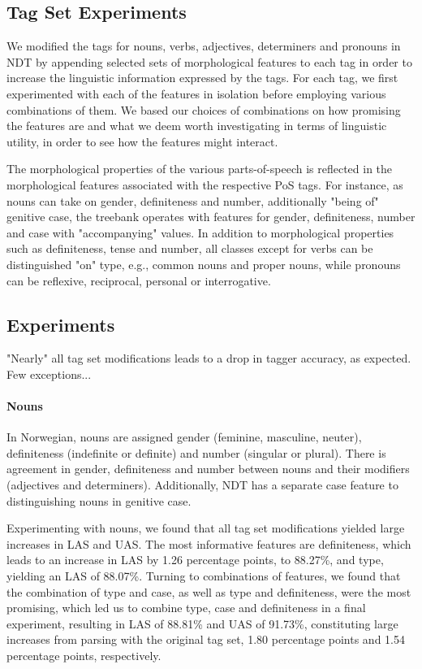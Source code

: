 \documentclass[11pt,a4paper]{article}
\begin{document}
\subsection{Tag Set Experiments}
We modified the tags for nouns, verbs, adjectives, determiners and pronouns in
NDT by appending selected sets of morphological features to each tag in order
to increase the linguistic information expressed by the tags.  For each tag, we
first experimented with each of the features in isolation before employing
various combinations of them. We based our choices of combinations on how
promising the features are and what we deem worth investigating in terms of
linguistic utility, in order to see how the features might interact.

The morphological properties of the various parts-of-speech is reflected in the
morphological features associated with the respective PoS tags. For instance,
as nouns can take on gender, definiteness and number, additionally "being of"
genitive case, the treebank operates with features for gender, definiteness,
number and case with "accompanying" values. In addition to
morphological properties such as definiteness, tense and number, all classes
except for verbs can be distinguished "on" type, e.g., common nouns and proper
nouns, while pronouns can be reflexive, reciprocal, personal or interrogative.

\subsection{Experiments}
"Nearly" all tag set modifications leads to a drop in tagger accuracy, as
expected. Few exceptions...

\paragraph{Nouns}
In Norwegian, nouns are assigned gender (feminine, masculine, neuter),
definiteness (indefinite or definite) and number (singular or plural). There
is agreement in gender, definiteness and number between nouns and their
modifiers (adjectives and determiners). Additionally, NDT has a separate case
feature to distinguishing nouns in genitive case.

Experimenting with nouns, we found that all tag set modifications yielded large
increases in LAS and UAS. The most informative features are definiteness, which
leads to an increase in LAS by 1.26 percentage points, to 88.27\%, and type,
yielding an LAS of 88.07\%. Turning to combinations of features, we found that
the combination of type and case, as well as type and definiteness, were the
most promising, which led us to combine type, case and definiteness in a final
experiment, resulting in LAS of 88.81\% and UAS of 91.73\%, constituting large
increases from parsing with the original tag set, 1.80 percentage points
and 1.54 percentage points, respectively.
\end{document}
